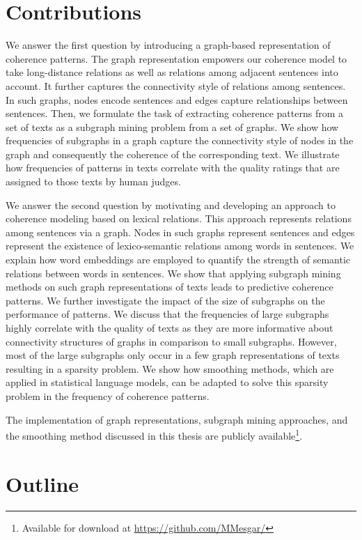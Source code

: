 \section{Contributions}
\label{sec:intro-contributions}

We answer the first question by introducing a graph-based representation of coherence patterns. 
The graph representation empowers our coherence model to take long-distance relations as well as relations among adjacent sentences into account. 
It further captures the connectivity style of relations among sentences. 
In such graphs, nodes encode sentences and edges capture relationships between sentences. 
Then, we formulate the task of extracting coherence patterns from a set of texts as a subgraph mining problem from a set of graphs. 
We show how frequencies of subgraphs in a graph capture the connectivity style of nodes in the graph and consequently the coherence of the corresponding text. 
We illustrate how frequencies of patterns in texts correlate with the quality ratings that are assigned to those texts by human judges. 

We answer the second question by motivating and developing an approach to coherence modeling based on lexical relations. 
This approach represents relations among sentences via a graph. 
Nodes in such graphs represent sentences and edges represent the existence of lexico-semantic relations among words in sentences. 
We explain how word embeddings are employed to quantify the strength of semantic relations between words in sentences. 
We show that applying subgraph mining methods on such graph representations of texts leads to predictive coherence patterns.   
We further investigate the impact of the size of subgraphs on the performance of patterns. 
We discuss that the frequencies of large subgraphs highly correlate with the quality of texts as they are more informative about connectivity structures of graphs in comparison to small subgraphs.
However, most of the large subgraphs only occur in a few graph representations of texts resulting in a sparsity problem.  
We show how smoothing methods, which are applied in statistical language models, can be adapted to solve this sparsity problem in the frequency of coherence patterns. 

The implementation of graph representations, subgraph mining approaches, and the smoothing method discussed in this thesis are publicly available\footnote{Available for download at \url{https://github.com/MMesgar/}}. 

\section{Outline}
\label{sec:intro-outline} 

